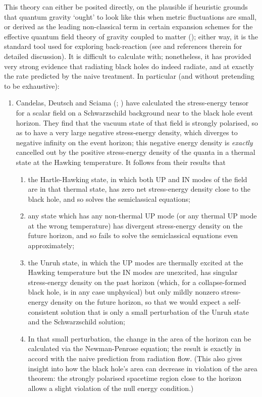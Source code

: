 \documentclass[12pt]{article}
\begin{document}
This theory can either be posited directly, on the plausible if heuristic grounds that quantum gravity `ought' to look like this when metric fluctuations are small, or derived as the leading non-classical term in certain expansion schemes for the effective quantum field theory of gravity coupled to matter (); either way, it is the standard tool used for exploring back-reaction (see  and references therein for detailed discussion). It is  difficult to calculate with; nonetheless, it has provided very strong evidence that radiating black holes do indeed radiate, and at exactly the rate predicted by the naive treatment.
In particular (and without pretending to be exhaustive):
\begin{enumerate}
\item Candelas, Deutsch and Sciama (; ) have calculated the stress-energy tensor for a scalar field on a Schwarzschild background near to the black hole event horizon. They find that the vacuum state of that field is strongly polarised, so as to have a very large negative stress-energy density, which diverges to negative infinity on the event horizon; this negative energy density is \emph{exactly} cancelled out by the positive stress-energy density of the quanta in a thermal state at the Hawking temperature. It follows from their results that 
\begin{enumerate}
\item the Hartle-Hawking state, in which both UP and IN modes of the field are in that thermal state, has zero net stress-energy density close to the black hole, and so solves the semiclassical equations;
\item any state which has any non-thermal UP mode (or any thermal UP mode at the wrong temperature) has divergent stress-energy density on the future horizon, and so fails to solve the semiclassical equations even approximately;
\item the Unruh state, in which the UP modes are thermally excited at the Hawking temperature but the IN modes are unexcited, has singular stress-energy density on the past horizon (which, for a collapse-formed black hole, is in any case unphysical) but only mildly nonzero stress-energy density on the future horizon, so that we would expect a self-consistent solution that is only a small perturbation of the Unruh state and the Schwarzschild solution;
\item In that small perturbation, the change in the area of the horizon can be calculated via the Newman-Penrose equation; the result is exactly in accord with the naive prediction from radiation flow. (This also gives insight into how the black hole's area can decrease in violation of the area theorem: the strongly polarised spacetime region close to the horizon allows a slight violation of the null energy condition.) 

\end{enumerate}
\end{enumerate}
\end{document}
